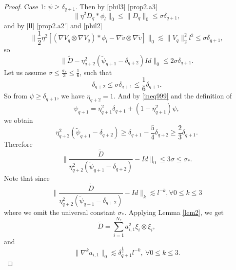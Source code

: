\documentclass[reqno,12pt]{amsart}
\numberwithin{equation}{section}
\theoremstyle{plain}
\theoremstyle{definition}
\begin{document}
\begin{proof}
Case 1: $\psi\ge \delta_{q+1}$. Then by \eqref{phil3} \eqref{prop2.a3}
\begin{equation*}
    \|\eta^2 D_q*\phi_l\|_0 \le \|D_q\|_0\le \sigma\delta_{q+1},
\end{equation*}
and by \eqref{ll} \eqref{prop2.a2'} and \eqref{phil2}
\begin{equation*}
    \|\frac{1}{2}\eta^2[(\nabla V_q\otimes\nabla V_q)*\phi_l-\nabla\tilde v\otimes\nabla\tilde v]\|_0 \lesssim \|V_q\|_2^2 l^2 \le \sigma\delta_{q+1},
\end{equation*}
so
\begin{equation*}
   \| \tilde D -\eta_{q+2}^2(\tilde\psi_{q+1} -\delta_{q+2})Id\|_0 \le 2\sigma\delta_{q+1}.
\end{equation*}
Let us assume $\sigma\le \frac{\sigma_*}{3}\le \frac{1}{6}$, such that
\begin{equation} \label{deltasigma}
    \delta_{q+2}\le \sigma\delta_{q+1}\le \frac{1}{6}\delta_{q+1}.
\end{equation}
So from $\psi\ge \delta_{q+1}$, we have $\eta_{q+2}=1$. And by \eqref{ineq999} and the definition of 
\begin{equation*}
 \psi_{q+1}=\eta^2_{q+1} \delta_{q+1} +(1-\eta^2_{q+1}) \psi,   
\end{equation*}
we obtain
\begin{equation*}
    \eta_{q+2}^2(\tilde\psi_{q+1}-\delta_{q+2}) \ge \delta_{q+1}-\frac{5}{4}\delta_{q+2}\ge \frac{2}{3}\delta_{q+1}.
\end{equation*}
Therefore
\begin{equation*}
    \|\frac{\tilde D}{\eta_{q+2}^2(\tilde\psi_{q+1}-\delta_{q+2})}-Id\|_0\le 3\sigma\le\sigma_*.
\end{equation*}
Note that since
\begin{equation*}
    \|\frac{\tilde D}{\eta_{q+2}^2(\tilde\psi_{q+1}-\delta_{q+2})}-Id\|_k\lesssim l^{-k},\forall 0\le k\le 3
\end{equation*}
where we omit the universal constant $\sigma_\ast$.
Applying Lemma \ref{lem2}, we get
\begin{equation}
    \tilde D=\sum_{i=1}^{N_*} a_{i,1}^2\xi_i\otimes\xi_i,
\end{equation}
and
\begin{equation*}
    \|\nabla^k a_{i,1}\|_0
    \lesssim \delta_{q+1}^\frac{1}{2}l^{-k},\ \forall 0\le k\le 3.
\end{equation*}


\end{proof}
\end{document}
